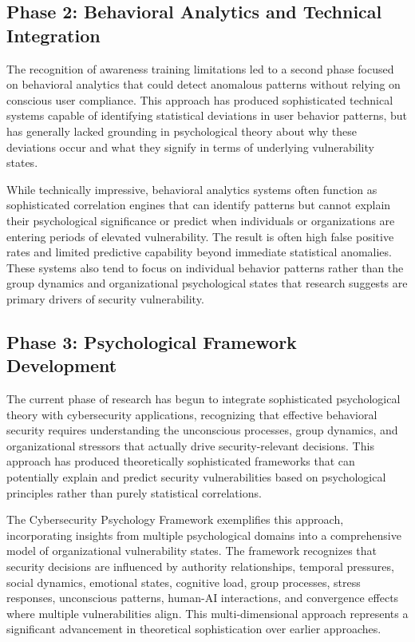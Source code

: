 \documentclass[10pt,twocolumn]{IEEEtran}
\begin{document}
\subsection{Phase 2: Behavioral Analytics and Technical Integration}

The recognition of awareness training limitations led to a second phase focused on behavioral analytics that could detect anomalous patterns without relying on conscious user compliance. This approach has produced sophisticated technical systems capable of identifying statistical deviations in user behavior patterns, but has generally lacked grounding in psychological theory about why these deviations occur and what they signify in terms of underlying vulnerability states.

While technically impressive, behavioral analytics systems often function as sophisticated correlation engines that can identify patterns but cannot explain their psychological significance or predict when individuals or organizations are entering periods of elevated vulnerability. The result is often high false positive rates and limited predictive capability beyond immediate statistical anomalies. These systems also tend to focus on individual behavior patterns rather than the group dynamics and organizational psychological states that research suggests are primary drivers of security vulnerability.

\subsection{Phase 3: Psychological Framework Development}

The current phase of research has begun to integrate sophisticated psychological theory with cybersecurity applications, recognizing that effective behavioral security requires understanding the unconscious processes, group dynamics, and organizational stressors that actually drive security-relevant decisions. This approach has produced theoretically sophisticated frameworks that can potentially explain and predict security vulnerabilities based on psychological principles rather than purely statistical correlations.

The Cybersecurity Psychology Framework exemplifies this approach, incorporating insights from multiple psychological domains into a comprehensive model of organizational vulnerability states. The framework recognizes that security decisions are influenced by authority relationships, temporal pressures, social dynamics, emotional states, cognitive load, group processes, stress responses, unconscious patterns, human-AI interactions, and convergence effects where multiple vulnerabilities align. This multi-dimensional approach represents a significant advancement in theoretical sophistication over earlier approaches.
\end{document}
